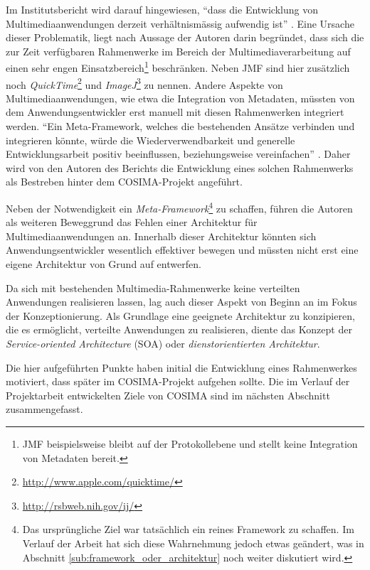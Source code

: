   Im Institutsbericht wird darauf hingewiesen, "`dass die Entwicklung von Multimediaanwendungen derzeit verhältnismässig aufwendig ist"' \citep[S. 2]{bericht}. Eine Ursache dieser Problematik, liegt nach Aussage der Autoren darin begründet, dass sich die zur Zeit verfügbaren Rahmenwerke im Bereich der Multimediaverarbeitung auf einen sehr engen Einsatzbereich\footnote{JMF beispielsweise bleibt auf der Protokollebene und stellt keine Integration von Metadaten bereit.} beschränken. Neben JMF sind hier zusätzlich noch \emph{QuickTime}\footnote{\url{http://www.apple.com/quicktime/}} und \emph{ImageJ}\footnote{\url{http://rsbweb.nih.gov/ij/}} zu nennen. Andere Aspekte von Multimediaanwendungen, wie etwa die Integration von Metadaten, müssten von dem Anwendungsentwickler erst manuell mit diesen Rahmenwerken integriert werden. "`Ein Meta-Framework, welches die bestehenden Ansätze verbinden und integrieren könnte, würde die Wiederverwendbarkeit und generelle Entwicklungsarbeit positiv beeinflussen, beziehungsweise vereinfachen"' \citep[S. 3]{bericht}. Daher wird von den Autoren des Berichts die Entwicklung eines solchen Rahmenwerks als Bestreben hinter dem COSIMA-Projekt angeführt.
  
  Neben der Notwendigkeit ein \emph{Meta-Framework}\footnote{Das ursprüngliche Ziel war tatsächlich ein reines Framework zu schaffen. Im Verlauf der Arbeit hat sich diese Wahrnehmung jedoch etwas geändert, was in Abschnitt \ref{sub:framework_oder_architektur} noch weiter diskutiert wird.} zu schaffen, führen die Autoren als weiteren Beweggrund das Fehlen einer Architektur für Multimediaanwendungen an. Innerhalb dieser Architektur könnten sich Anwendungsentwickler wesentlich effektiver bewegen und müssten nicht erst eine eigene Architektur von Grund auf entwerfen.
  
  Da sich mit bestehenden Multimedia-Rahmenwerke keine verteilten Anwendungen realisieren lassen, lag auch dieser Aspekt von Beginn an im Fokus der Konzeptionierung. Als Grundlage eine geeignete Architektur zu konzipieren, die es ermöglicht, verteilte Anwendungen zu realisieren, diente das Konzept der \emph{Service-oriented Architecture} (SOA) oder \emph{dienstorientierten Architektur}.
  
  Die hier aufgeführten Punkte haben initial die Entwicklung eines Rahmenwerkes motiviert, dass später im COSIMA-Projekt aufgehen sollte. Die im Verlauf der Projektarbeit entwickelten Ziele von COSIMA sind im nächsten Abschnitt zusammengefasst.

